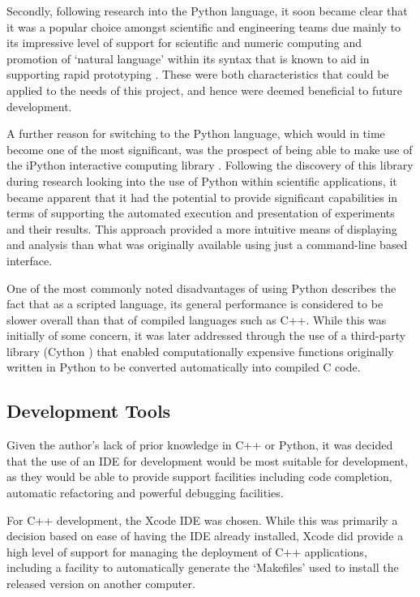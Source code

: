 Secondly, following research into the Python language, it soon became clear that it was a popular choice amongst scientific and engineering teams due mainly to its impressive level of support for scientific and numeric computing \cite{perez} and promotion of `natural language' within its syntax that is known to aid in supporting rapid prototyping \cite{ramanujam}. These were both characteristics that could be applied to the needs of this project, and hence were deemed beneficial to future development.


A further reason for switching to the Python language, which would in time become one of the most significant, was the prospect of being able to make use of the iPython interactive computing library \cite{ipython}. Following the discovery of this library during research looking into the use of Python within scientific applications, it became apparent that it had the potential to provide significant capabilities in terms of supporting the automated execution and presentation of experiments and their results. This approach provided a more  intuitive means of displaying and analysis than what was originally available using just a command-line based interface. 

One of the most commonly noted disadvantages of using Python describes the fact that as a scripted language, its general performance is considered to be slower overall than that of compiled languages such as C++. While this was initially of some concern, it was later addressed through the use of a third-party library (Cython \cite{cython}) that enabled computationally expensive functions originally written in Python to be converted automatically into compiled C code.

\subsection{Development Tools}

Given the author's lack of prior knowledge in C++ or Python, it was decided that the use of an IDE for development would be most suitable for development, as they would be able to provide support facilities including code completion, automatic refactoring and powerful debugging facilities. 

For C++ development, the Xcode IDE \cite{xcode} was chosen. While this was primarily a decision based on ease of having the IDE already installed, Xcode did provide a high level of support for managing the deployment of C++ applications, including a facility to automatically generate the `Makefiles' used to install the released version on another computer. 

